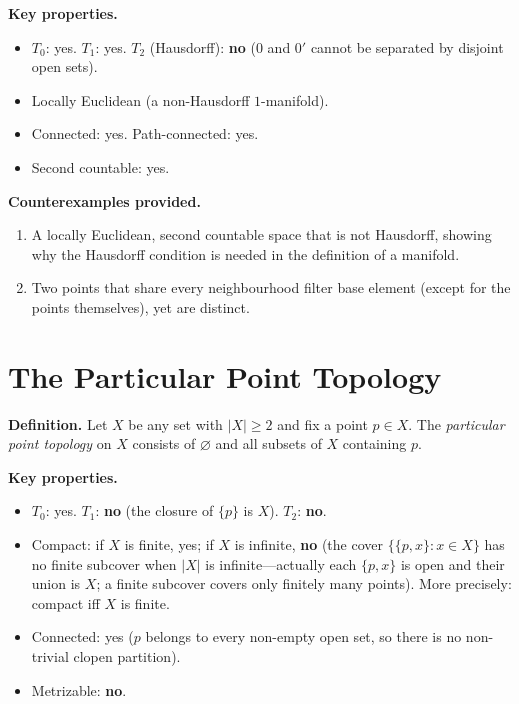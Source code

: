 \documentclass[11pt,a4paper,twoside]{book}
\theoremstyle{remark}
\theoremstyle{definition}
\theoremstyle{definition}
\begin{document}
\medskip
\textbf{Key properties.}
\begin{itemize}
  \item $T_0$: yes. \quad $T_1$: yes. \quad $T_2$ (Hausdorff): \textbf{no}
        ($0$ and $0'$ cannot be separated by disjoint open sets).
  \item Locally Euclidean (a non-Hausdorff $1$-manifold).
  \item Connected: yes. \quad Path-connected: yes.
  \item Second countable: yes.
\end{itemize}

\textbf{Counterexamples provided.}
\begin{enumerate}
  \item A locally Euclidean, second countable space that is not
        Hausdorff, showing why the Hausdorff condition is needed in the
        definition of a manifold.
  \item Two points that share every neighbourhood filter base element
        (except for the points themselves), yet are distinct.
\end{enumerate}

\section{The Particular Point Topology}
\label{app:particular-point}

\textbf{Definition.}
Let $X$ be any set with $|X|\ge 2$ and fix a point $p\in X$.  The
\emph{particular point topology} on $X$ consists of $\varnothing$ and
all subsets of $X$ containing $p$.

\medskip
\textbf{Key properties.}
\begin{itemize}
  \item $T_0$: yes. \quad $T_1$: \textbf{no} (the closure of $\{p\}$ is
        $X$). \quad $T_2$: \textbf{no}.
  \item Compact: if $X$ is finite, yes; if $X$ is infinite, \textbf{no}
        (the cover $\{\{p,x\}:x\in X\}$ has no finite subcover when
        $|X|$ is infinite---actually each $\{p,x\}$ is open and their
        union is $X$; a finite subcover covers only finitely many
        points).  More precisely: compact iff $X$ is finite.
  \item Connected: yes ($p$ belongs to every non-empty open set, so
        there is no non-trivial clopen partition).
  \item Metrizable: \textbf{no}.
\end{itemize}
\end{document}
